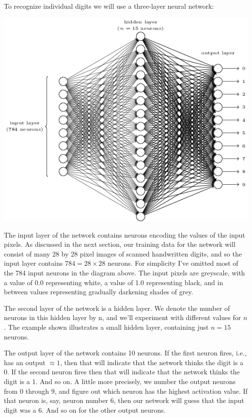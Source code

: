 \documentclass[a4paper,twoside,10pt]{book}
\begin{document}
To recognize individual digits we will use a three-layer neural network:
\begin{center}
	\includegraphics[scale=0.65]{./figures/ch1/tikz12}
\end{center}
The input layer of the network contains neurons encoding the values of the input pixels. As discussed in the next section, our training data for the network will consist of many 28 by 28 pixel images of scanned handwritten digits, and so the input layer contains $784=28\times28$ neurons. For simplicity I've omitted most of the 784 input neurons in the diagram above. The input pixels are greyscale, with a value of 0.0 representing white, a value of 1.0 representing black, and in between values representing gradually darkening shades of grey.

The second layer of the network is a hidden layer. We denote the number of neurons in this hidden layer by n, and we'll experiment with different values for $n$. The example shown illustrates a small hidden layer, containing just $n=15$ neurons.

The output layer of the network contains 10 neurons. If the first neuron fires, i.e., has an output $\approx 1$, then that will indicate that the network thinks the digit is a 0. If the second neuron fires then that will indicate that the network thinks the digit is a 1. And so on. A little more precisely, we number the output neurons from 0 through 9, and figure out which neuron has the highest activation value. If that neuron is, say, neuron number 6, then our network will guess that the input digit was a 6. And so on for the other output neurons.
\end{document}

